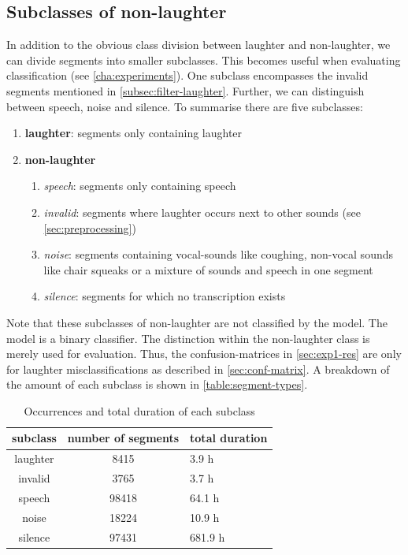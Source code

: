 \documentclass[bsc,frontabs,parskip,deptreport]{infthesis}
\begin{document}
\subsection{Subclasses of non-laughter}
In addition to the obvious class division between laughter and non-laughter, we can divide segments into smaller subclasses. This becomes useful when evaluating classification (see \autoref{cha:experiments}).
One subclass encompasses the invalid segments mentioned in \autoref{subsec:filter-laughter}. 
Further, we can distinguish between speech, noise and silence.
To summarise there are five subclasses:
\begin{enumerate}
    \item \textbf{laughter}: segments only containing laughter
    \item \textbf{non-laughter}
    \begin{enumerate}
        \item \textit{speech}: segments only containing speech
        \item \textit{invalid}: segments where laughter occurs next to other sounds (see \autoref{sec:preprocessing})
        \item \textit{noise}: segments containing vocal-sounds like coughing, non-vocal sounds like chair squeaks or a mixture of sounds and speech in one segment
        \item \textit{silence}: segments for which no transcription exists
    \end{enumerate}
\end{enumerate}
Note that these subclasses of non-laughter are not classified by the model. The model is a binary classifier. The distinction within the non-laughter class is merely used for evaluation.
Thus, the confusion-matrices in \autoref{sec:exp1-res} are only for laughter misclassifications as described in \autoref{sec:conf-matrix}.
A breakdown of the amount of each subclass is shown in \autoref{table:segment-types}.

\begin{table}[h!]
\begin{tabular}{c|c|l}
     subclass & number of segments & total duration \\
     \hline
     laughter & 8415 & 3.9 h \\ 
     invalid & 3765 & 3.7 h \\
     speech & 98418 & 64.1 h \\
     noise & 18224 & 10.9 h \\
     silence & 97431 & 681.9 h 
\end{tabular}
\centering
\caption{Occurrences and total duration of each subclass}
\label{table:segment-types}
\end{table}
\end{document}
